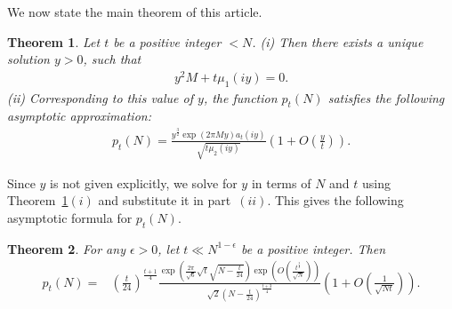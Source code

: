 \documentclass[11pt]{amsart}
\theoremstyle{plain}
\newtheorem{theorem}{Theorem}[section]
\numberwithin{equation}{section}
\begin{document}
	We now state the main theorem of this article.
	\begin{theorem}\label{theorem-1.2}
		Let $t$ be a positive integer $<N$.
		\newline
		(i) Then there exists a unique solution $y>0$, such that
		\begin{align}\label{eq-1.1}
			y^{2}M+t\mu_{1}(iy)=0.
		\end{align}
		(ii) Corresponding to this value of $y$, the function $p_t(N)$ satisfies the following asymptotic approximation:
		\begin{align*}
			p_t(N)=\frac{y^{\frac{3}{2}}\exp(2\pi My)a_{t}(iy)}{\sqrt{t\mu_{2}(iy)}}\left(1+O\left(\frac{y}{t}\right)\right).    
		\end{align*}
	\end{theorem}
	Since $y$ is not given explicitly, we solve for $y$ in terms of $N$ and $t$ using Theorem~\ref{theorem-1.2}$(i)$ and substitute it in part~$(ii)$. This gives the following asymptotic formula for $p_t(N)$.
	\begin{theorem}\label{theorem-1.1}
		For any $\epsilon > 0$, let $t \ll N^{1 - \epsilon}$ be a positive integer. Then
		\begin{align*}
			p_t(N)=&\left(\frac{t}{24}\right)^{\frac{t+1}{4}}\frac{\exp\left(\frac{2\pi}{\sqrt{6}}\sqrt{t}\sqrt{N-\frac{t}{24}}\right)\exp\left(O\left(\frac{t^{\frac{3}{2}}}{\sqrt{N}}\right)\right)}{\sqrt{2}\left(N-\frac{t}{24}\right)^{\frac{t+3}{4}}}\left(1 + O\left(\frac{1}{\sqrt{Nt}}\right)\right). 
		\end{align*}
	\end{theorem}
	
\end{document}
